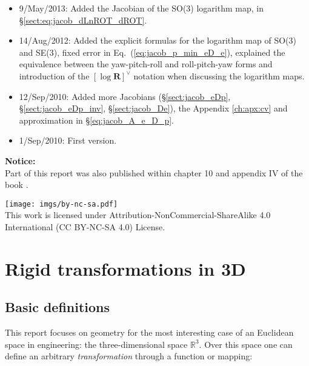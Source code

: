 \documentclass[a4paper,11pt]{report}
\begin{document}
\begin{itemize}
 \item 9/May/2013: Added the Jacobian of the SO(3) logarithm map, in \S\ref{sect:eq:jacob_dLnROT_dROT}.

 \item 14/Aug/2012: Added the explicit formulas for the logarithm map of SO(3) and SE(3),
    fixed error in Eq.~(\ref{eq:jacob_p_min_eD_e}), explained the equivalence between the yaw-pitch-roll
and roll-pitch-yaw forms and introduction of the $\left[ \log \mathbf{R} \right]^\vee$ notation
when discussing the logarithm maps.

 \item 12/Sep/2010: Added more Jacobians (\S\ref{sect:jacob_eDp},
\S\ref{sect:jacob_eDp_inv}, \S\ref{sect:jacob_De}),
         the Appendix \ref{ch:apx:cv} and approximation in \S\ref{eq:jacob_A_e_D_p}.

 \item 1/Sep/2010: First version.
\end{itemize}


\vfill
\textbf{Notice:} \\

Part of this report was also published within chapter 10 and appendix IV of the
book \cite{madrigal2012slambook}.

\vspace{1cm}

\begin{scriptsize}
\begin{center}
\texttt{[image: imgs/by-nc-sa.pdf]}
\\
This work is licensed under
Attribution-NonCommercial-ShareAlike 4.0 International (CC BY-NC-SA 4.0)
License.
\end{center}

\end{scriptsize}


\newpage

\tableofcontents


\chapter{Rigid transformations in 3D}


\section{Basic definitions}
\label{sect:basic}

This report focuses on geometry for the most interesting case of an Euclidean space in
engineering: the three-dimensional space $\mathbb{R}^3$.
Over this space one can define an arbitrary \emph{transformation} through
a function or mapping:
\end{document}

